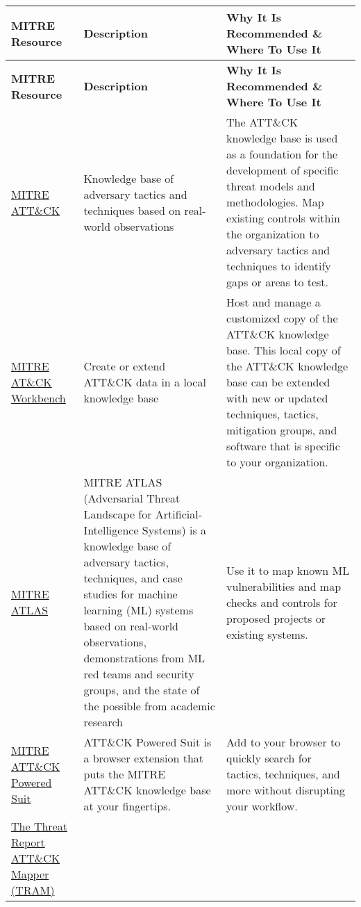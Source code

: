 \setlength\LTleft{0pt}
\setlength\LTright{0pt}
\begin{longtable}[c]{|p{}|p{}|p{}|}
  \hline
  \rowcolor{owasplightpurple}
  \textbf{MITRE Resource} &
  \textbf{Description} &
  \textbf{Why It Is Recommended \& Where To Use It} \\
  \hline
  \endfirsthead
  \hline
  \rowcolor{owasplightpurple}
  \textbf{MITRE Resource} &
  \textbf{Description} &
  \textbf{Why It Is Recommended \& Where To Use It} \\
  \hline
  \endhead
  \endfoot
  \href{https://attack.mitre.org/}{MITRE ATT\&CK} &
  Knowledge base of adversary tactics and techniques based on real-world observations &
  The ATT\&CK knowledge base is used as a foundation for the development of
  specific threat models and methodologies. Map existing controls within the
  organization to adversary tactics and techniques to identify gaps or areas to
  test. \\
  \hline
  \href{https://medium.com/mitre-engenuity/att-ck-workbench-2-0-your-bench-your-team-your-most-relevant-ttps-5b9620457ef4}{MITRE AT\&CK Workbench} &
  Create or extend ATT\&CK data in a local knowledge base &
  Host and manage a customized copy of the ATT\&CK knowledge base. This local
  copy of the ATT\&CK knowledge base can be extended with new or updated
  techniques, tactics, mitigation groups, and software that is specific to your
  organization. \\
  \hline
  \href{https://atlas.mitre.org/}{MITRE ATLAS} &
  MITRE ATLAS (Adversarial Threat Landscape for Artificial-Intelligence Systems)
  is a knowledge base of adversary tactics, techniques, and case studies for
  machine learning (ML) systems based on real-world observations, demonstrations
  from ML red teams and security groups, and the state of the possible from
  academic research &
  Use it to map known ML vulnerabilities and map checks and controls for
  proposed projects or existing systems. \\
  \hline
  \href{https://mitre-engenuity.org/cybersecurity/center-for-threat-informed-defense/attack-powered-suit/}{MITRE ATT\&CK Powered Suit} &
  ATT\&CK Powered Suit is a browser extension that puts the MITRE ATT\&CK
  knowledge base at your fingertips. &
  Add to your browser to quickly search for tactics, techniques, and more
  without disrupting your workflow. \\
  \hline
  \href{https://mitre-engenuity.org/cybersecurity/center-for-threat-informed-defense/our-work/threat-report-attck-mapper-tram/}{The Threat Report ATT\&CK Mapper (TRAM)} &

\end{longtable}
